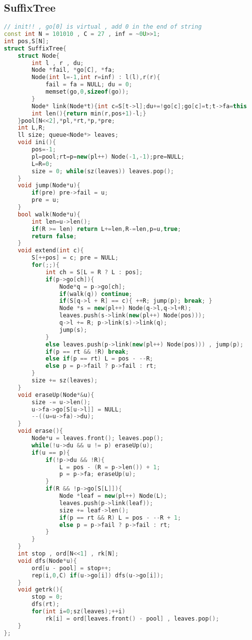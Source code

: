 \subsection{SuffixTree}
\begin{lstlisting}[language=C++]
// init!! , go[0] is virtual , add 0 in the end of string
const int N = 101010 , C = 27 , inf = ~0U>>1;
int pos,S[N];
struct SuffixTree{
    struct Node{
        int l , r , du;
        Node *fail, *go[C], *fa;
        Node(int l=-1,int r=inf) : l(l),r(r){
            fail = fa = NULL; du = 0;
            memset(go,0,sizeof(go));
        }
        Node* link(Node*t){int c=S[t->l];du+=!go[c];go[c]=t;t->fa=this;return t;}
        int len(){return min(r,pos+1)-l;}
    }pool[N<<2],*pl,*rt,*p,*pre;
    int L,R;
    ll size; queue<Node*> leaves;
    void ini(){
        pos=-1;
        pl=pool;rt=p=new(pl++) Node(-1,-1);pre=NULL;
        L=R=0;
        size = 0; while(sz(leaves)) leaves.pop();
    }
    void jump(Node*u){
        if(pre) pre->fail = u;
        pre = u;
    }
    bool walk(Node*u){
        int len=u->len();
        if(R >= len) return L+=len,R-=len,p=u,true;
        return false;
    }
    void extend(int c){
        S[++pos] = c; pre = NULL;
        for(;;){
            int ch = S[L = R ? L : pos];
            if(p->go[ch]){
                Node*q = p->go[ch];
                if(walk(q)) continue;
                if(S[q->l + R] == c){ ++R; jump(p); break; }
                Node *s = new(pl++) Node(q->l,q->l+R);
                leaves.push(s->link(new(pl++) Node(pos)));
                q->l += R; p->link(s)->link(q);
                jump(s);
            }
            else leaves.push(p->link(new(pl++) Node(pos))) , jump(p);
            if(p == rt && !R) break;
            else if(p == rt) L = pos - --R;
            else p = p->fail ? p->fail : rt;
        }
        size += sz(leaves);
    }
    void eraseUp(Node*&u){
        size -= u->len();
        u->fa->go[S[u->l]] = NULL;
        --((u=u->fa)->du);
    }
    void erase(){
        Node*u = leaves.front(); leaves.pop();
        while(!u->du && u != p) eraseUp(u);
        if(u == p){
            if(!p->du && !R){
                L = pos - (R = p->len()) + 1;
                p = p->fa; eraseUp(u);
            }
            if(R && !p->go[S[L]]){
                Node *leaf = new(pl++) Node(L);
                leaves.push(p->link(leaf));
                size += leaf->len();
                if(p == rt && R) L = pos - --R + 1;
                else p = p->fail ? p->fail : rt;
            }
        }
    }
    int stop , ord[N<<1] , rk[N];
    void dfs(Node*u){
        ord[u - pool] = stop++;
        rep(i,0,C) if(u->go[i]) dfs(u->go[i]);
    }
    void getrk(){
        stop = 0;
        dfs(rt);
        for(int i=0;sz(leaves);++i)
            rk[i] = ord[leaves.front() - pool] , leaves.pop();
    }
};
\end{lstlisting}

